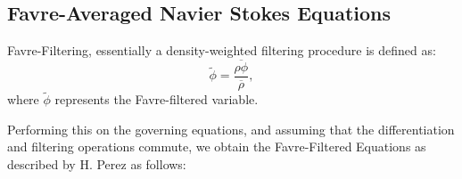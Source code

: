 \subsection{Favre-Averaged Navier Stokes Equations} \label{subsection:Favre}
Favre-Filtering, essentially a density-weighted filtering procedure is defined as:
\begin{equation}
 \tilde{\phi}=\frac{\overline{\rho \phi}}{\overline{\rho}},
 \end{equation}
where $\tilde{\phi}$ represents the Favre-filtered variable.

Performing this on the governing equations, and assuming that the differentiation and filtering operations commute, we obtain the Favre-Filtered Equations as described by H. Perez \cite{HPerez:2011} as follows:\par

